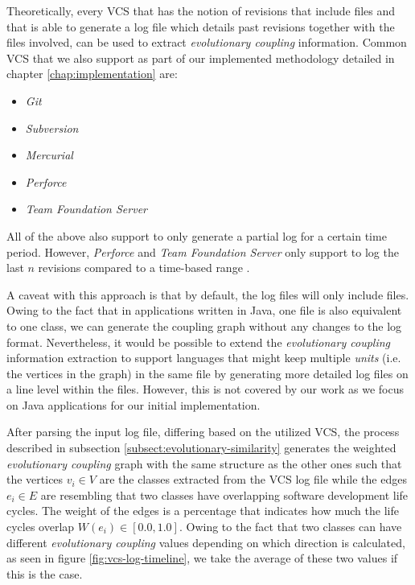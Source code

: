 \documentclass[12pt,a4paper]{report}
\begin{document}
Theoretically, every VCS that has the notion of revisions that include files
and that is able to generate a log file which details past revisions together
with the files involved, can be used to extract \textit{evolutionary coupling}
information. Common VCS that we also support as part of our implemented
methodology detailed in chapter \ref{chap:implementation} are:
\begin{itemize}[noitemsep]
  \item \textit{Git}
  \item \textit{Subversion}
  \item \textit{Mercurial}
  \item \textit{Perforce}
  \item \textit{Team Foundation Server}
\end{itemize}
All of the above also support to only generate a partial log for a certain
time period. However, \textit{Perforce} and \textit{Team Foundation Server}
only support to log the last \(n\) revisions compared to a time\hyp based range
\cite{perforce, team-foundation-server}.

A caveat with this approach is that by default, the log files will only
include files. Owing to the fact that in applications written in Java,
one file is also equivalent to one class, we can generate the coupling graph
without any changes to the log format. Nevertheless, it would be possible
to extend the \textit{evolutionary coupling} information extraction to support
languages that might keep multiple \textit{units} (i.e. the vertices in the graph)
in the same file by generating more detailed log files on a line level within
the files. However, this is not covered by our work as we focus on
Java applications for our initial implementation.

After parsing the input log file, differing based on the utilized VCS,
the process described in subsection \ref{subsect:evolutionary-similarity}
generates the weighted \textit{evolutionary coupling} graph with the same
structure as the other ones such that the vertices \(v_i \in V\) are the classes
extracted from the VCS log file while the edges \(e_i \in E\) are resembling
that two classes have overlapping software development life cycles.
The weight of the edges is a percentage that indicates how much the
life cycles overlap \(W(e_i) \in [0.0, 1.0]\). Owing to the fact that two
classes can have different \textit{evolutionary coupling} values depending on
which direction is calculated, as seen in figure \ref{fig:vcs-log-timeline},
we take the average of these two values if this is the case.
\end{document}
